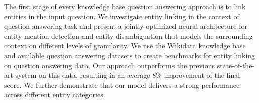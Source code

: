 The first stage of every knowledge base question answering approach is to link entities in the input question. We investigate entity linking in the context of question answering task and present a jointly optimized neural architecture for entity mention detection and entity disambiguation that models the surrounding context on different levels of granularity. We use the Wikidata knowledge base and available question answering datasets to create benchmarks for entity linking on question answering data. Our approach outperforms the previous state-of-the-art system on this data, resulting in an average 8\% improvement of the final score. We further demonstrate that our model delivers a strong performance across different entity categories.
